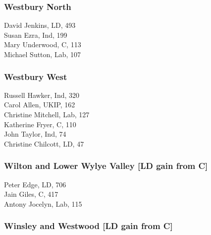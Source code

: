 \documentclass[a4paper,openany,10pt]{book}
\begin{document}
\subsubsection*{Westbury North}



David Jenkins, LD, 493\\
Susan Ezra, Ind, 199\\
Mary Underwood, C, 113\\
Michael Sutton, Lab, 107\\


\subsubsection*{Westbury West}



Russell Hawker, Ind, 320\\
Carol Allen, UKIP, 162\\
Christine Mitchell, Lab, 127\\
Katherine Fryer, C, 110\\
John Taylor, Ind, 74\\
Christine Chilcott, LD, 47\\


\subsubsection*{Wilton and Lower Wylye Valley \hspace*{\fill}\nolinebreak[1]%
\enspace\hspace*{\fill}
[LD gain from C]}



Peter Edge, LD, 706\\
Jain Giles, C, 417\\
Antony Jocelyn, Lab, 115\\


\subsubsection*{Winsley and Westwood \hspace*{\fill}\nolinebreak[1]%
\enspace\hspace*{\fill}
[LD gain from C]}
\end{document}
